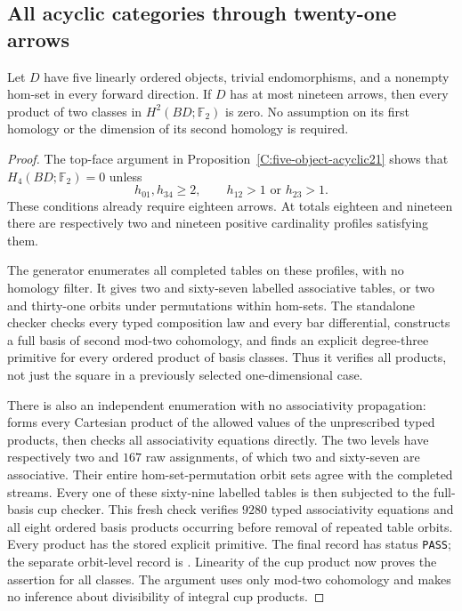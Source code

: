 \subsection{All acyclic categories through twenty-one arrows}

\begin{lemma}
\label{C:five-chain-nineteen-products}
Let $D$ have five linearly ordered objects, trivial endomorphisms,
and a nonempty hom-set in every forward direction.  If $D$ has
at most nineteen arrows, then every product of two classes in
$H^2(BD;\mathbb F_2)$ is zero.  No assumption on its first homology
or the dimension of its second homology is required.
\end{lemma}
\begin{proof}
The top-face argument in Proposition~\ref{C:five-object-acyclic21}
shows that $H_4(BD;\mathbb F_2)=0$ unless
\[
 h_{01},h_{34}\geq2,\qquad h_{12}>1\text{ or }h_{23}>1.
\]
These conditions already require eighteen arrows.  At totals
eighteen and nineteen there are respectively two and nineteen
positive cardinality profiles satisfying them.

The generator  enumerates
all completed tables on these profiles, with no homology filter.
It gives two and sixty-seven labelled associative tables, or two
and thirty-one orbits under permutations within hom-sets.
The standalone checker 
checks every typed composition law and every bar differential,
constructs a full basis of second mod-two cohomology, and finds
an explicit degree-three primitive for every ordered product
of basis classes.  Thus it verifies all products, not just the
square in a previously selected one-dimensional case.

There is also an independent enumeration with no associativity
propagation:  forms every
Cartesian product of the allowed values of the unprescribed
typed products, then checks all associativity equations directly.
The two levels have respectively two and $167$ raw assignments,
of which two and sixty-seven are associative.  Their entire
hom-set-permutation orbit sets agree with the completed streams.
Every one of these sixty-nine labelled tables is then subjected
to the full-basis cup checker.  This fresh check verifies $9280$
typed associativity equations and all eight ordered basis
products occurring before removal of repeated table orbits.
Every product has the stored explicit primitive.  The final
record  has
status \texttt{PASS}; the separate orbit-level record is
.
Linearity of the cup product now proves the assertion for all
classes.  The argument uses only mod-two cohomology and makes
no inference about divisibility of integral cup products.
\end{proof}

